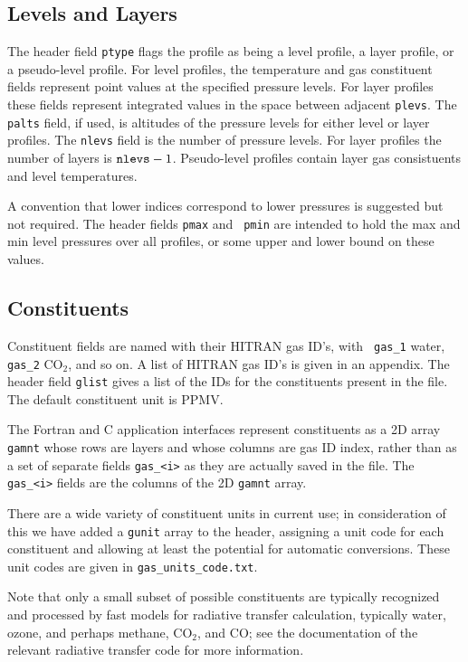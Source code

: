 \documentclass[11pt]{article}
\begin{document}
\subsection{Levels and Layers}

The header field {\tt ptype} flags the profile as being a level
profile, a layer profile, or a pseudo-level profile.  For level
profiles, the temperature and gas constituent fields represent point
values at the specified pressure levels.  For layer profiles these
fields represent integrated values in the space between adjacent
{\tt plevs}.  The {\tt palts} field, if used, is altitudes of the
pressure levels for either level or layer profiles.  The {\tt nlevs}
field is the number of pressure levels.  For layer profiles the
number of layers is ${\tt nlevs} - 1$.  Pseudo-level profiles
contain layer gas consistuents and level temperatures.

A convention that lower indices correspond to lower pressures is
suggested but not required.  The header fields {\tt pmax} and {\tt
pmin} are intended to hold the max and min level pressures over all
profiles, or some upper and lower bound on these values.

\subsection{Constituents}

Constituent fields are named with their HITRAN gas ID's, with {\tt
  gas\_1} water, {\tt gas\_2} CO$_2$, and so on.  A list of HITRAN
gas ID's is given in an appendix.  The header field {\tt glist}
gives a list of the IDs for the constituents present in the file.
The default constituent unit is PPMV.

The Fortran and C application interfaces represent constituents as a
2D array {\tt gamnt} whose rows are layers and whose columns are gas
ID index, rather than as a set of separate fields {\tt gas\_<i>} as
they are actually saved in the file.  The {\tt gas\_<i>} fields are
the columns of the 2D {\tt gamnt} array.

There are a wide variety of constituent units in current use; in
consideration of this we have added a {\tt gunit} array to the
header, assigning a unit code for each constituent and allowing at
least the potential for automatic conversions.  These unit codes are
given in {\tt gas\_units\_code.txt}.

Note that only a small subset of possible constituents are typically
recognized and processed by fast models for radiative transfer
calculation, typically water, ozone, and perhaps methane, CO$_2$,
and CO; see the documentation of the relevant radiative transfer
code for more information.
\end{document}
